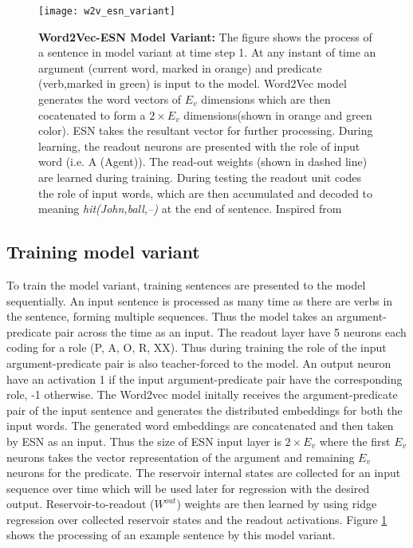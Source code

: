 \begin{figure}[hbtp]
\centering
\texttt{[image: w2v\_esn\_variant]}
\caption[Variant of Word2Vec-ESN language model] {\textbf{Word2Vec-ESN Model Variant:} 
The figure shows the process of a sentence in model variant at time step 1. At any instant of time an argument (current word, marked in orange) and predicate (verb,marked in green) is input to the model. Word2Vec model generates the word vectors of $E_{v}$ dimensions which are then cocatenated to form a $2 \times E_{v}$ dimensions(shown in orange and green color). ESN takes the resultant vector for further processing. During learning, the readout neurons are presented with the role of input word (i.e. A (Agent)). The read-out weights (shown in dashed line) are learned during training. During testing the readout unit codes the role of input words, which are then accumulated and decoded to meaning \textit{hit(John,ball,--)} at the end of sentence. Inspired from \cite{xavier:2013:RT}
}
\label{fig:model_variant_2}
\end{figure}

\newpage
\subsection{Training model variant}
To train the model variant, training sentences are presented to the model sequentially. An input sentence is processed as many time as there are verbs in the sentence, forming multiple sequences. Thus the model takes  an argument-predicate pair across the time as an input. The readout layer have 5 neurons each coding for a role (P, A, O, R, XX). Thus during training the role of the input argument-predicate pair is also teacher-forced to the model. An output neuron have an activation 1 if the input argument-predicate pair have the corresponding role, -1 otherwise. The Word2vec model initally receives the argument-predicate pair of the input sentence and generates the distributed embeddings for both the input words. The generated word embeddings are concatenated and then taken by ESN as an input. Thus the size of ESN input layer is $2 \times E_{v}$ where the first $E_{v}$ neurons takes the vector representation of the argument and remaining $E_{v}$ neurons for the predicate. The reservoir internal states are collected for an input sequence over time which will be used later for regression with the desired output. Reservoir-to-readout ($W^{out}$) weights are then learned by using ridge regression over collected reservoir states and the readout activations. Figure \ref{fig:model_variant_2} shows the processing of an example sentence by this model variant.

